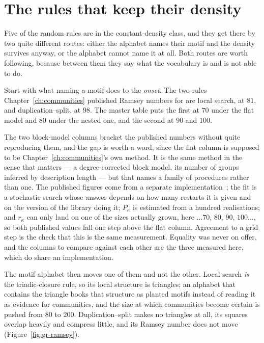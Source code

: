 \section{The rules that keep their density}
\label{sec:gr-chapter6}

Five of the random rules are in the constant-density class, and they get there by
two quite different routes: either the alphabet names their motif and the density
survives anyway, or the alphabet cannot name it at all. Both routes are worth
following, because between them they say what the vocabulary is and is not able
to do.

Start with what naming a motif does to the \emph{onset}. The two rules
Chapter~\ref{ch:communities} published Ramsey numbers for are local search, at
$81$, and duplication--split, at $98$. The master table puts the first at $70$
under the flat model and $80$ under the nested one, and the second at $90$ and
$100$.

The two block-model columns bracket the published numbers without
quite reproducing them, and the gap is worth a word, since the flat column is
supposed to be Chapter~\ref{ch:communities}'s own method. It is the same method
in the sense that matters --- a degree-corrected block model, its number of groups
inferred by description length --- but that names a family of procedures rather
than one. The published figures come from a separate
implementation~\citep{vazquezcommunities2025}; the fit is a stochastic search
whose answer depends on how many restarts it is given and on the version of the
library doing it; $P_\kappa$ is estimated from a hundred realisations; and
$r_\kappa$ can only land on one of the sizes actually grown, here $\ldots70$,
$80$, $90$, $100\ldots$, so both published values fall one step above the flat
column. Agreement to a grid step is the check that this is the same measurement.
Equality was never on offer, and the columns to compare against each other are
the three measured here, which do share an implementation.

The motif alphabet then moves one of them and not the other. Local search
\emph{is} the triadic-closure rule, so its local structure is triangles; an
alphabet that contains the triangle books that structure as planted motifs
instead of reading it as evidence for communities, and the size at which
communities become certain is pushed from $80$ to $200$. Duplication--split makes
no triangles at all, its squares overlap heavily and compress little, and its
Ramsey number does not move (Figure~\ref{fig:gr-ramsey}).


